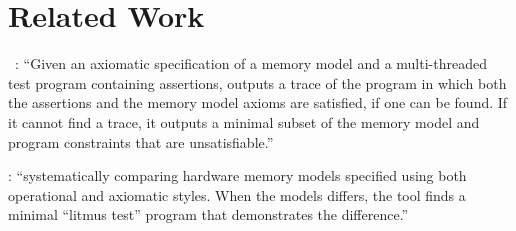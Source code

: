 
\section{Related Work} \label{section:related-work}

\memsat~\cite{MemSAT:PLDI2010}: ``Given an axiomatic specification of a memory model
and a multi-threaded test program containing assertions,
\memsat{} outputs a trace of the program in which both the assertions
and the memory model axioms are satisfied, if one can be found.
If it cannot find a trace, it outputs a minimal subset of the memory model and program constraints
that are unsatisfiable.''


\cite{Contrasting:CAV2010}: ``systematically comparing hardware memory models
specified using both operational and axiomatic styles.
When the models differs, the tool finds a minimal “litmus test”
program that demonstrates the difference.''
